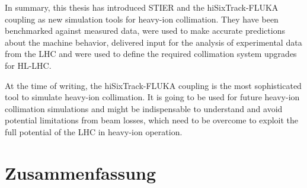 \thispagestyle{plain}
\vspace{0.2cm} 

In summary, this thesis has introduced STIER and the hiSixTrack-FLUKA coupling as new simulation tools for heavy-ion collimation. They have been benchmarked against measured data, were used to make accurate predictions about the machine behavior,  delivered input for the analysis of experimental data from the LHC and were used to define the required collimation system upgrades for HL-LHC. 
\vspace{0.2cm} 

At the time of writing, the hiSixTrack-FLUKA coupling is the most sophisticated tool to simulate heavy-ion collimation. It is going to be used for future heavy-ion collimation simulations and might be indispensable to understand and avoid potential limitations from beam losses, which need to be overcome to exploit the full potential of the LHC in heavy-ion operation. 




\chapter*{Zusammenfassung} \label{chap:sum}

\thispagestyle{empty}


